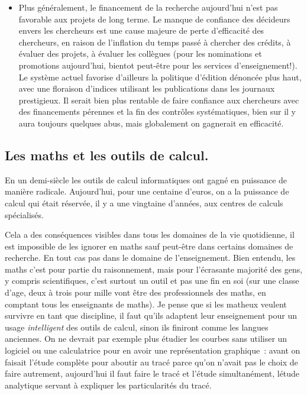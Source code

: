 \documentclass[a4paper,11pt]{article}
\begin{document}
\begin{giacjshere}
\begin{itemize}
{du logiciel.}.
\item Plus g\'en\'eralement, le financement de la recherche
aujourd'hui n'est pas favorable aux projets de long terme.
Le manque de confiance des d\'ecideurs envers les chercheurs
est une cause majeure de perte d'efficacit\'e des chercheurs,
en raison de l'inflation du temps pass\'e \`a chercher des cr\'edits,
\`a \'evaluer des projets, \`a \'evaluer les coll\`egues
(pour les nominations et promotions aujourd'hui, bientot peut-\^etre pour les services
d'enseignement!). Le syst\`eme actuel favorise d'ailleurs la politique
d'\'edition d\'enonc\'ee plus haut, avec une floraison d'indices utilisant
les publications dans les journaux prestigieux. Il serait bien plus
rentable de faire confiance aux chercheurs avec des financements
p\'erennes et la fin des contr\^oles syst\'ematiques, bien sur il y aura
toujours quelques abus, mais globalement on gagnerait en efficacit\'e.
\end{itemize}

\subsection{Les maths et les outils de calcul.}
En un demi-si\`ecle les outils de calcul informatiques ont
gagn\'e en puissance de mani\`ere radicale. Aujourd'hui,
pour une centaine d'euros, on a la puissance de calcul
qui \'etait r\'eserv\'ee, il y a une vingtaine d'ann\'ees, 
aux centres de calculs sp\'ecialis\'es. 

Cela a des cons\'equences
visibles dans tous les domaines de la vie quotidienne, il
est impossible de les ignorer en maths sauf peut-\^etre
dans certains domaines de recherche. En tout
cas pas dans le domaine de l'enseignement. Bien entendu,
les maths c'est pour partie du raisonnement, mais pour
l'\'ecrasante majorit\'e des gens, y compris scientifiques,
c'est surtout un outil et pas une fin en soi (sur une classe
d'age, deux \`a trois pour mille vont
\^etre des professionnels des maths, en comptant tous les
enseignants de maths). Je pense que si les matheux veulent survivre
en tant que discipline, il faut qu'ils adaptent leur enseignement
pour un usage {\em intelligent} des outils de calcul, sinon ils finiront
comme les langues anciennes. On ne devrait par exemple 
plus \'etudier les courbes sans utiliser un logiciel ou une
calculatrice pour en avoir une repr\'esentation graphique~: 
avant on faisait l'\'etude compl\`ete pour aboutir au trac\'e 
parce qu'on n'avait pas le choix de faire autrement, aujourd'hui il faut
faire le trac\'e et l'\'etude simultan\'ement, l\'etude analytique
servant \`a expliquer les particularit\'es du trac\'e.


\end{giacjshere}
\end{document}
